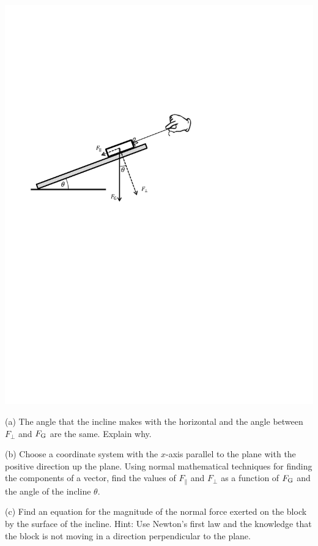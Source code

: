 \vspace{0.3cm}
{\par\centering \includegraphics{newton/newton_fig10_new.pdf} \par}
\vspace{0.3cm}


(a) The angle that the incline makes with the horizontal and the angle between
\( {F}_{{\perp}} \) and \(F_{\rm G} \) are the same. Explain why.
\vspace{20mm}

(b) Choose a coordinate system with the $x$-axis parallel to the plane with the
positive direction up the plane. Using normal mathematical techniques for finding the components of a vector, find the values of 
\( F_{\parallel} \) and \( F_{\perp} \)
as a function of \( F_{\rm G} \) and the angle of the incline \( \theta  \).
\vspace{20mm}

(c) Find an equation for the magnitude of the normal force exerted on the
block by the surface of the incline. Hint: Use Newton's first law and the knowledge that the block is not moving in a direction perpendicular to the plane.

